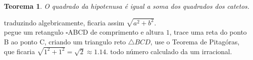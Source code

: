 \documentclass[a4paper]{article}
\newtheorem{theorem}{Teorema}
\begin{document}
\begin{theorem}
O quadrado da hipotenusa é igual a soma dos quadrados dos catetos.
\end{theorem}

traduzindo algebricamente, ficaria assim $\sqrt{a^2+b^2}$.\\

pegue um retangulo $\square$ABCD de comprimento e altura $1$, trace uma reta do ponto B ao ponto C, criando um triangulo reto $\triangle BCD$, use o Teorema de Pitagóras, que ficaria
$\sqrt{1^2+1^2}= \sqrt{2} \approx 1.14$. todo número calculado da um irracional. \\

\centering
{}
\end{document}
